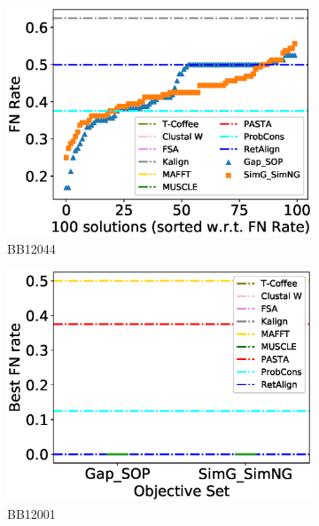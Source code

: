 \begin{figure}[!htbp]
\begin{adjustwidth}{-1.5cm}{-1cm}
\begin{subfigure}{0.22\textwidth}
			\includegraphics[width=\columnwidth]{Figure/summary/precomputedInit/Balibase/BB12044_fnrate_density_single_run}
			\caption{BB12044}
		\end{subfigure}
		\begin{subfigure}{0.22\textwidth}
			\includegraphics[width=\columnwidth]{Figure/summary/precomputedInit/Balibase/BB12001_objset_fnrate_rank}
			\caption{BB12001}
		\end{subfigure}	
		\begin{subfigure}{0.22\textwidth}

\end{subfigure}
\end{adjustwidth}
\end{figure}
